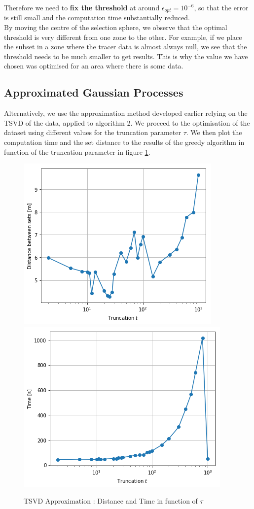 Therefore we need to \textbf{fix the threshold} at around $ \epsilon_{opt} = 10^{-6}$, so that the error is still small and the computation time substantially reduced. \\ 


By moving the centre of the selection sphere, we observe that the optimal threshold is very different from one zone to the other. For example, if we place the subset in a zone where the tracer data is almost always null, we see that the threshold needs to be much smaller to get results. This is why the value we have chosen was optimised for an area where there is some data. 


\subsection{Approximated Gaussian Processes}

Alternatively, we use the approximation method developed earlier relying on the TSVD of the data, applied to algorithm 2. We proceed to the optimisation of the dataset using different values for the truncation parameter $\tau$. We then plot the computation time and the set distance to the results of the greedy algorithm in function of the truncation parameter in figure \ref{fig:small_set:tsvd}.

\begin{figure}[h]
\centering
\includegraphics[height=0.33\linewidth]{figures/CompAlg/tsvd/dist_trunc}
~
\includegraphics[height=0.33\linewidth]{figures/CompAlg/tsvd/time_trunc}
\caption{TSVD Approximation : Distance and Time in function of $\tau$}
\label{fig:small_set:tsvd}
\end{figure}

